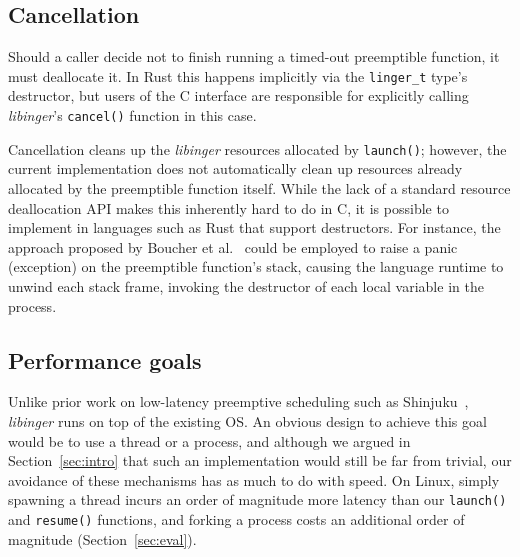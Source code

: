 


\subsection{Cancellation}

Should a caller decide not to finish running a timed-out preemptible function, it
must deallocate it.  In Rust this happens implicitly via the \texttt{linger\_t}
type's destructor, but users of the C interface are responsible for explicitly
calling \textit{libinger}'s \texttt{cancel()} function in this case.

Cancellation cleans up the \textit{libinger} resources allocated by
\texttt{launch()};
however, the current implementation
does not automatically clean up resources already allocated by the
preemptible function itself.  While the lack of a standard resource deallocation API
makes this inherently hard to do in C, it is possible to implement in languages
such as Rust that support destructors.  For instance, the approach proposed by
Boucher et al.~\cite{boucher:atc2018} could be employed to raise a panic
(exception) on the preemptible function's stack, causing the language runtime
to unwind each stack frame, invoking the destructor of each local variable in
the process.


\subsection{Performance goals}


Unlike prior work on low-latency preemptive scheduling such as
Shinjuku~\cite{Kaffes:nsdi2019}, \textit{libinger} runs on top of the existing
OS.  An obvious design to achieve this goal would be to use a thread or a process,
and although we argued in Section~\ref{sec:intro} that such an implementation would
still be far from trivial, our avoidance of these mechanisms has as much to do with
speed.  On Linux, simply spawning a thread incurs an order of magnitude more latency
than our \texttt{launch()} and \texttt{resume()} functions, and forking a process
costs an additional order of magnitude (Section~\ref{sec:eval}).

